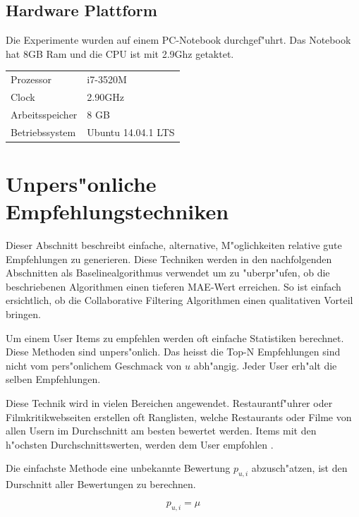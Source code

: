 \documentclass[a4paper, 12pt]{article}
\begin{document}
\subsection{Hardware Plattform}
\label{platform}

Die Experimente wurden auf einem PC-Notebook durchgef"uhrt. Das Notebook hat 8GB Ram und die CPU ist mit 2.9Ghz getaktet.

\begin{center}
\begin{tabular}{ll}
 Prozessor        &  i7-3520M            \\
 Clock            &  2.90GHz             \\
 Arbeitsspeicher  &  8 GB                \\
 Betriebssystem   &  Ubuntu 14.04.1 LTS  \\
\end{tabular}
\end{center}

\section{Unpers"onliche Empfehlungstechniken}
\label{sec:simple}

Dieser Abschnitt beschreibt einfache, alternative, M"oglichkeiten relative gute Empfehlungen zu generieren. Diese Techniken werden in den nachfolgenden Abschnitten als Baselinealgorithmus verwendet um zu "uberpr"ufen, ob die beschriebenen Algorithmen einen tieferen MAE-Wert erreichen. So ist einfach ersichtlich, ob die Collaborative Filtering Algorithmen einen qualitativen Vorteil bringen.

Um einem User Items zu empfehlen werden oft einfache Statistiken berechnet. Diese Methoden sind unpers"onlich. Das heisst die Top-N Empfehlungen sind nicht vom pers"onlichem Geschmack von $u$ abh"angig. Jeder User erh"alt die selben Empfehlungen. 

Diese Technik wird in vielen Bereichen angewendet. Restaurantf"uhrer oder Filmkritikwebseiten erstellen oft Ranglisten, welche Restaurants oder Filme von allen Usern im Durchschnitt am besten bewertet werden. Items mit den h"ochsten Durchschnittswerten, werden dem User empfohlen \cite{jannach11}.

Die einfachste Methode eine unbekannte Bewertung $p_{u,i}$ abzusch"atzen, ist den Durschnitt aller Bewertungen zu berechnen.

\begin{equation}
  \label{eq:avg}
  p_{u,i} = \mu
\end{equation}
\end{document}
